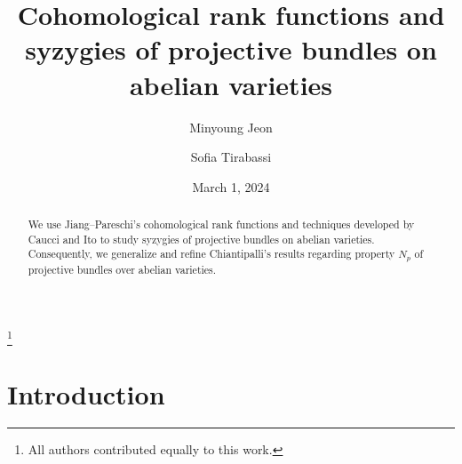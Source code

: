 \documentclass[11pt,letter]{amsart}
\numberwithin{equation}{section}
\begin{document}
	\title[Syzygies of Projective Bundles]{Cohomological rank functions and syzygies of projective bundles on abelian varieties}
	\author{Minyoung Jeon}
	  \address{Department of Mathematics\\University of Georgia, Athens GA 30602, USA}
  \author{Sofia Tirabassi}
  \address{Department of Mathematics\\ Stockholm University, Albano campus Hus 1, Stockholm, Sweden}

\date{March 1, 2024}


\thanks{All authors contributed equally to this work.}



\clearpage\maketitle 

\begin{abstract}
We use Jiang--Pareschi's cohomological rank functions and techniques developed by Caucci and Ito to study syzygies of projective bundles on abelian varieties. Consequently, we generalize and refine Chiantipalli's results regarding property $N_p$ of projective bundles over abelian varieties.


\end{abstract}

\section{Introduction}
\end{document}
